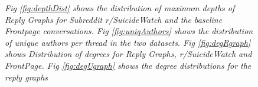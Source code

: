 \begin{figure}[!ht]
    \centering
    
    
    \caption{\textsl{ Fig \ref{fig:depthDist} shows the distribution of maximum depths of Reply Graphs for Subreddit r/SuicideWatch and the baseline Frontpage conversations. Fig \ref{fig:uniqAuthors} shows the distribution of unique authors per thread in the two datasets. Fig \ref{fig:degRgraph} shows Distribution of degrees for Reply Graphs,  r/SuicideWatch and FrontPage. Fig \ref{fig:degUgraph} shows the degree distributions for the reply graphs}}
\end{figure}

